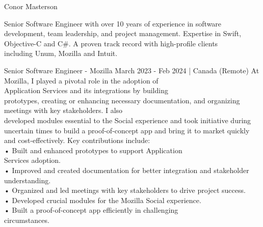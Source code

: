 \documentclass[
	10pt, %
]{FreemanCV}
\begin{document}
	
{\sffamily\Huge\noindent Conor Masterson} %
	
\medskip %
	
{\noindent Senior Software Engineer with over 10 years of experience in software development, team leadership, and project management. Expertise in Swift, Objective-C and C\#. A proven track record with high-profile clients \\including Unum, Mozilla and Intuit.}
\medskip

\begin{paracol}{2} %


\jobentry
	{Senior Software Engineer - Mozilla}
    {March 2023 - Feb 2024 | Canada (Remote)}
    {At Mozilla, I played a pivotal role in the adoption of \\Application Services and its integrations by building \\prototypes, creating or enhancing necessary documentation, and organizing meetings with key stakeholders. I also \\developed modules essential to the Social experience and took initiative during uncertain times to build a proof-of-concept app and bring it to market quickly and cost-effectively. Key contributions include:\medskip\\
    • Built and enhanced prototypes to support Application \\Services adoption.\\
    • Improved and created documentation for better integration and stakeholder understanding.\\
    • Organized and led meetings with key stakeholders to drive project success.\\
    • Developed crucial modules for the Mozilla Social experience.\\
    • Built a proof-of-concept app efficiently in challenging \\circumstances.}



\end{paracol}
\end{document}
